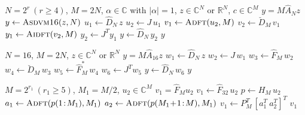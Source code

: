 \begin{algorithm}[!t]
\caption{$\mathit{Asdvm}$: $y = M\hat{A}_N z$}\label{alg:asdvm}
\begin{algorithmic}[1]
\Require $N=2^r\ (r\ge4)$, $M=2N$, $\alpha\in\mathbb{C}$ with $|\alpha|=1$, $z\in\mathbb{C}^N$ or $\mathbb{R}^N$, $c\in\mathbb{C}^M$
\Ensure $y = M\hat{A}_N z$
    \State $y \gets \Call{Asdvm16}{z, N}$
  \EndIf
    \State $u_1 \gets \hat{D}_N\, z$
    \State $u_2 \gets J\, u_1$
    \State $v_1 \gets \Call{Adft}{u_2, M}$
    \State $v_2 \gets \breve{D}_M\, v_1$
    \State $y_1 \gets \Call{Aidft}{v_2, M}$
    \State $y_2 \gets J^{T} y_1$
    \State $y \gets \hat{D}_N\, y_2$
  \EndIf
  \State \Return $y$
\EndFunction
\end{algorithmic}
\end{algorithm}

\begin{algorithm}[!t]
\caption{$\mathit{Asdvm16}$: $y = M\hat{A}_{16} z$}\label{alg:asdvm16}
\begin{algorithmic}[1]
\Require $N=16$, $M=2N$, $z\in\mathbb{C}^N$ or $\mathbb{R}^N$
\Ensure $y = M\hat{A}_{16} z$
    \State $w_1 \gets \hat{D}_N\, z$
    \State $w_2 \gets J\, w_1$
    \State $w_3 \gets \hat{F}_M\, w_2$ 
    \State $w_4 \gets \breve{D}_M\, w_3$
    \State $w_5 \gets \hat{F}^{*}_M\, w_4$ 
    \State $w_6 \gets J^{T} w_5$
    \State $y \gets \hat{D}_N\, w_6$
  \EndIf
  \State \Return $y$
\EndFunction
\end{algorithmic}
\end{algorithm}

\begin{algorithm}[!t]
\caption{$\mathit{Adft}$: $v_1 = \hat{F}_M u_2$}\label{alg:adft}
\begin{algorithmic}[1]
\Require $M=2^{r_1}\ (r_1\ge5)$, $M_1=M/2$, $u_2\in\mathbb{C}^M$
\Ensure $v_1 = \hat{F}_M u_2$
    \State $v_1 \gets \hat{F}_{32}\, u_2$
  \EndIf
    \State $p \gets H_M\, u_2$
    \State $a_1 \gets \Call{Adft}{p(1\!:\!M_1), M_1}$
    \State $a_2 \gets \Call{Adft}{p(M_1\!+\!1\!:\!M), M_1}$
    \State $v_1 \gets P_M^{T}\,[a_1^T\ a_2^T]^T$
  \EndIf
  \State \Return $v_1$
\EndFunction
\end{algorithmic}
\end{algorithm}

